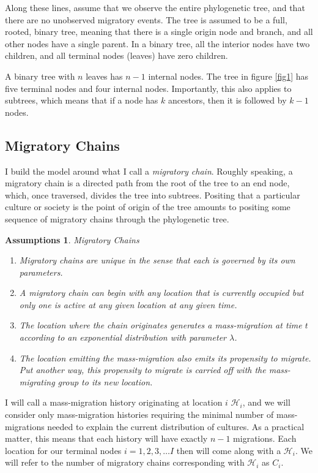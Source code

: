 \documentclass[11pt]{article}
\newtheorem{assumptions}{Assumptions}
\begin{document}
Along these lines, assume that we observe the entire phylogenetic tree, and that there are no unobserved migratory events. The tree is assumed to be a full, rooted, binary tree, meaning that there is a single origin node and branch, and all other nodes have a single parent. In a binary tree, all the interior nodes have two children, and all terminal nodes (leaves) have zero children. 

A binary tree with $n$ leaves has $n-1$ internal nodes. The tree in figure \ref{fig1} has five terminal nodes and four internal nodes. Importantly, this also applies to subtrees, which means that if a node has $k$ ancestors, then it is followed by $k-1$ nodes.

\subsection{Migratory Chains}
 
I build the model around what I call a  \textit{migratory chain}. Roughly speaking, a migratory chain is a directed path from the root of the tree to an end node, which, once traversed, divides the tree into subtrees. Positing that a particular culture or society is the point of origin of the tree amounts to positing some sequence of migratory chains through the phylogenetic tree. \begin{assumptions}{Migratory Chains}    
\begin{enumerate}
\item Migratory chains are unique in the sense that each is governed by its own parameters. 
\item  A migratory chain can begin with any location that is currently occupied but only one is active at any given location at any given time. 
\item The location where the chain originates generates a mass-migration at time $t$ according to an exponential distribution with parameter $\lambda$.
\item The location emitting the mass-migration also emits its propensity to migrate. Put another way, this propensity to migrate is carried off with the mass-migrating group to its new location. 
\end{enumerate}
\end{assumptions}
I will call a mass-migration history originating at location $i$ $\mathcal{H}_i$, and we will consider only mass-migration histories requiring the minimal number of mass-migrations needed to explain the current distribution of cultures. As a practical matter, this means that each history will have exactly $n-1$ migrations. Each location for our terminal nodes $i=1,2,3,\hdots I$ then will come along with a $\mathcal{H}_i$. We will refer to the number of migratory chains corresponding with $\mathcal{H}_i$ as $C_i$. 
\end{document}
